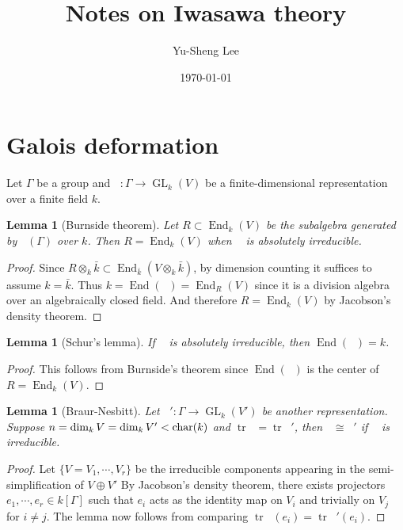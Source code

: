 \documentclass[leqno]{amsart}
\DeclareMathOperator{\GL}{GL}
\DeclareMathOperator{\mtr}{tr}
\newcommand{\1}{\mathbf{1}}
\DeclareMathOperator{\End}{End}
\DeclareMathOperator{\rrho}{\bar{\rho}}
\newtheorem{lem}[thm]{Lemma}
\theoremstyle{definition}
\theoremstyle{remark}
\begin{document}
\title{Notes on Iwasawa theory}
\author[Y-S.~Lee]{Yu-Sheng Lee}
\address{Department of Mathematics, University  of Michigan, Ann Arbor, MI 48109, USA}
\date{\today}

\maketitle
\setcounter{tocdepth}{1}
\tableofcontents


\section{Galois deformation}



Let $\Gamma$ be a group 
and  $\rrho\colon \Gamma\to \GL_k(V)$
be a finite-dimensional representation
over a finite field $k$.
\begin{lem}[Burnside theorem]
Let $R\subset \End_k(V)$
be the subalgebra generated by  $\rrho(\Gamma)$ over  $k$.
Then $R=\End_k(V)$ when 
$\rrho$ is absolutely irreducible.
\end{lem}
\begin{proof}
	Since $R\otimes_k\bar{k}\subset 
	\End_{\bar{k}}(V\otimes_k\bar{k})$,
	by dimension counting it suffices 
	to assume $k=\bar{k}$.
	Thus $k=\End(\rrho)=\End_R(V)$ since
	it is a division algebra
	over an algebraically closed field.
	And therefore $R=\End_k(V)$
	by Jacobson's density theorem.
\end{proof}
\begin{lem}[Schur's lemma]
	If $\rrho$ is absolutely irreducible,
	then $\End(\rrho)=k$.
\end{lem}
\begin{proof}
	This follows from Burnside's theorem
	since $\End(\rrho)$ is the center of $R=\End_k(V)$.
\end{proof}
\begin{lem}[Braur-Nesbitt]
	Let $\rrho'\colon \Gamma\to \GL_k(V')$
	be another representation.
	Suppose $n=\dim_kV=\dim_kV'<\textnormal{char}(k)$
	and  $\mtr\rrho=\mtr\rrho'$,
	then  $\rrho\cong\rrho'$
	if $\rrho$ is irreducible.
\end{lem}
\begin{proof}
	Let $\{V=V_1,\cdots,V_r\}$ 
	be the irreducible components 
	appearing in the semi-simplification
	of  $V\oplus V'$
	By Jacobson's density theorem,
	there exists projectors
	$e_1,\cdots,e_r\in k[\Gamma]$
	such that $e_i$ acts as the identity map on  $V_i$
	and trivially on  $V_j$ for  $i\neq j$.
	The lemma now follows from comparing
	$\mtr\rrho(e_i)=\mtr\rrho'(e_i)$.
\end{proof}
\end{document}
